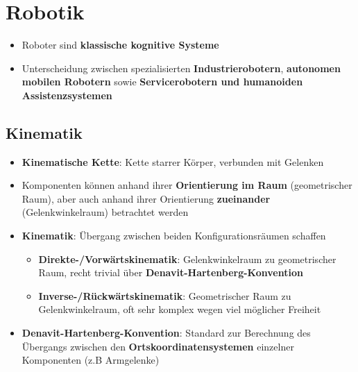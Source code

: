 \section{Robotik}%
\label{rob:sec:robotik}

\begin{itemize}
	\item Roboter sind \textbf{klassische kognitive Systeme}
	\item Unterscheidung zwischen spezialisierten \textbf{Industrierobotern}, \textbf{autonomen mobilen Robotern} sowie \textbf{Servicerobotern und humanoiden Assistenzsystemen}
\end{itemize}

\subsection{Kinematik}%
\label{rob:sub:kinematik}

\begin{itemize}
	\item \textbf{Kinematische Kette}: Kette starrer Körper, verbunden mit Gelenken
	\item Komponenten können anhand ihrer \textbf{Orientierung im Raum} (geometrischer Raum), aber auch anhand ihrer Orientierung \textbf{zueinander} (Gelenkwinkelraum) betrachtet werden
	\item \textbf{Kinematik}: Übergang zwischen beiden Konfigurationsräumen schaffen
	\begin{itemize}
		\item \textbf{Direkte-/Vorwärtskinematik}: Gelenkwinkelraum zu geometrischer Raum, recht trivial über \textbf{Denavit-Hartenberg-Konvention}
		\item \textbf{Inverse-/Rückwärtskinematik}: Geometrischer Raum zu Gelenkwinkelraum, oft sehr komplex wegen viel möglicher Freiheit
	\end{itemize}
	\item \textbf{Denavit-Hartenberg-Konvention}: Standard zur Berechnung des Übergangs zwischen den \textbf{Ortskoordinatensystemen} einzelner Komponenten (z.B Armgelenke)
\end{itemize}